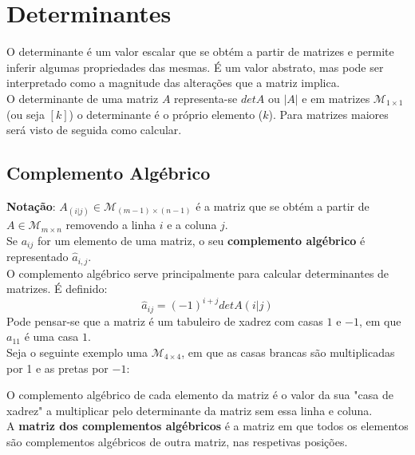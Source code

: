\documentclass[]{report}
\begin{document}
\section{Determinantes}
O determinante é um valor escalar que se obtém a partir de matrizes e permite inferir algumas propriedades das mesmas. É um valor abstrato, mas pode ser interpretado como a magnitude das alterações que a matriz implica.\\
O determinante de uma matriz $A$ representa-se $det A$ ou $|A|$ e em matrizes $\mathcal{M}_{1 \times 1}$ (ou seja $[k]$) o determinante é o próprio elemento ($k$). Para matrizes maiores será visto de seguida como calcular.
\subsection{Complemento Algébrico}
\textbf{Notação}: $A_{(i|j)} \in \mathcal{M}_{(m-1) \times (n-1)}$ é a matriz que se obtém a partir de $A \in \mathcal{M}_{m \times n}$ removendo a linha $i$ e a coluna $j$.\\[0.5cm]
Se $a_{ij}$ for um elemento de uma matriz, o seu \textbf{complemento algébrico} é representado $\hat a_{i,j}$.\\
O complemento algébrico serve principalmente para calcular determinantes de matrizes. É definido:
$$\hat a_{ij} = (-1)^{i+j} det A(i|j)$$
Pode pensar-se que a matriz é um tabuleiro de xadrez com casas $1$ e $-1$, em que $a_{11}$ é uma casa $1$.\\
Seja o seguinte exemplo uma $\mathcal{M}_{4 \times 4}$, em que as casas brancas são multiplicadas por 1 e as pretas por $-1$:
\begin{center}
\end{center}
O complemento algébrico de cada elemento da matriz é o valor da sua "casa de xadrez" a multiplicar pelo determinante da matriz sem essa linha e coluna.\\[0.2cm]
A \textbf{matriz dos complementos algébricos} é a matriz em que todos os elementos são complementos algébricos de outra matriz, nas respetivas posições.
\end{document}
